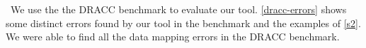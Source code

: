\
We use the the DRACC benchmark \cite{dracc-benchmark}
to evaluate our tool. 
\autoref{dracc-errors} shows some distinct errors found 
by our tool in the benchmark\cite{dracc-benchmark} and the examples of
\autoref{s2}. We were able to find all the 
data mapping errors in the DRACC benchmark. 
